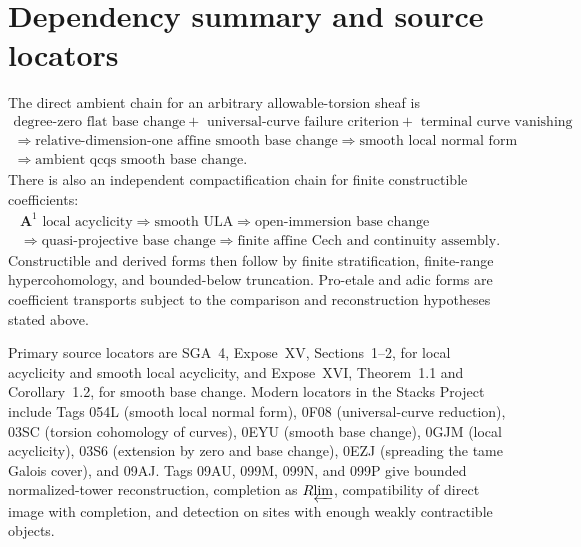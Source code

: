 \documentclass[10pt]{article}
\theoremstyle{definition}
\newcommand{\Rlim}{R\!\varprojlim}
\begin{document}
\section{Dependency summary and source locators}

The direct ambient chain for an arbitrary allowable-torsion sheaf is
\[
\begin{gathered}
 \text{degree-zero flat base change}
 +\text{ universal-curve failure criterion}
 +\text{ terminal curve vanishing}\\
 \Longrightarrow \text{relative-dimension-one affine smooth base change}
 \Longrightarrow \text{smooth local normal form}\\
 \Longrightarrow \text{ambient qcqs smooth base change}.
\end{gathered}
\]
There is also an independent compactification chain for finite constructible
coefficients:
\[
\begin{gathered}
 \mathbf A^1\text{ local acyclicity}
 \Longrightarrow \text{smooth ULA}
 \Longrightarrow \text{open-immersion base change}\\
 \Longrightarrow \text{quasi-projective base change}
 \Longrightarrow \text{finite affine Cech and continuity assembly}.
\end{gathered}
\]
Constructible and derived forms then follow by finite stratification,
finite-range hypercohomology, and bounded-below truncation. Pro-etale and
adic forms are coefficient transports subject to the comparison and
reconstruction hypotheses stated above.

Primary source locators are SGA~4, Expose~XV, Sections~1--2, for local
acyclicity and smooth local acyclicity, and Expose~XVI, Theorem~1.1 and
Corollary~1.2, for smooth base change. Modern locators in the Stacks Project
include Tags 054L (smooth local normal form), 0F08 (universal-curve
reduction), 03SC (torsion cohomology of curves), 0EYU (smooth base change),
0GJM (local acyclicity), 03S6 (extension by zero and base change), 0EZJ
(spreading the tame Galois cover), and 09AJ.  Tags 09AU, 099M, 099N, and 099P
give bounded normalized-tower reconstruction, completion as $\Rlim$,
compatibility of direct image with completion, and detection on sites with
enough weakly contractible objects.
\end{document}
